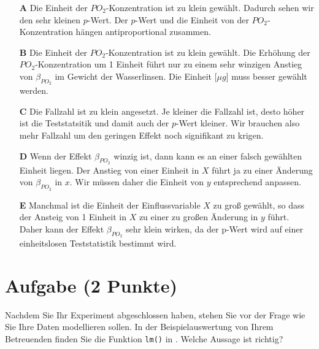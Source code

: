 \documentclass[a4paper, 9pt]{scrartcl}\usepackage[]{graphicx}\usepackage[]{xcolor}
\begin{document}
\begin{enumerate}
\item [\textbf{A} \msquare] Die Einheit der $PO_2$-Konzentration ist zu klein gewählt. Dadurch sehen wir den sehr kleinen $p$-Wert. Der $p$-Wert und die Einheit von der $PO_2$-Konzentration hängen antiproportional zusammen.
\item [\textbf{B} \msquare] Die Einheit der $PO_2$-Konzentration ist zu klein gewählt. Die Erhöhung der $PO_2$-Konzentration um 1 Einheit führt nur zu einem sehr winzigen Anstieg von $\beta_{PO_2}$ im Gewicht der Wasserlinsen. Die Einheit [$\mu g$] muss besser gewählt werden.
\item [\textbf{C} \msquare] Die Fallzahl ist zu klein angesetzt. Je kleiner die Fallzahl ist, desto höher ist die Teststatsitik und damit auch der $p$-Wert kleiner. Wir brauchen also mehr Fallzahl um den geringen Effekt noch signifikant zu krigen.
\item [\textbf{D} \msquare] Wenn der Effekt $\beta_{PO_2}$ winzig ist, dann kann es an einer falsch gewählten Einheit liegen. Der Anstieg von einer Einheit in $X$ führt ja zu einer Änderung von $\beta_{PO_2}$ in $x$. Wir müssen daher die Einheit von $y$ entsprechend anpassen.
\item [\textbf{E} \msquare] Manchmal ist die Einheit der Einflussvariable $X$ zu groß gewählt, so dass der Ansteig von 1 Einheit in $X$ zu einer zu großen Änderung in $y$ führt. Daher kann der Effekt $\beta_{PO_2}$ sehr klein wirken, da der p-Wert wird auf einer einheitslosen Teststatistik bestimmt wird.
\end{enumerate}

\section{Aufgabe \hfill (2 Punkte)}



Nachdem Sie Ihr Experiment abgeschlossen haben, stehen Sie vor der Frage wie Sie Ihre Daten modellieren sollen. In der Beispielauswertung von Ihrem Betreuenden finden Sie die Funktion \texttt{lm()} in \Rlogo. Welche Aussage ist richtig?
\end{document}
